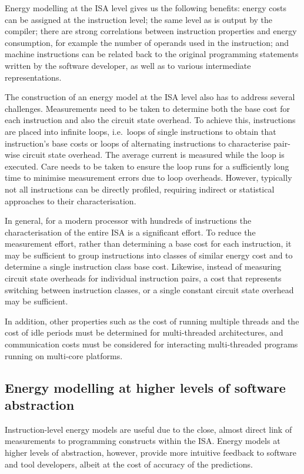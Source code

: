 \documentclass[oneside]{book}
\begin{document}
Energy modelling at the ISA level gives us the following benefits: energy
costs can be assigned at the instruction level; the same level as is output by
the compiler; there are strong correlations between instruction properties and
energy consumption, for example the number of operands used in the instruction;
and machine instructions can be related back to the original programming
statements written by the software developer, as well as to various
intermediate representations. 

The construction of an energy model at the ISA level also has to address several
challenges.
%
Measurements need to be taken to determine both the base cost for each
instruction and also the circuit state overhead. To achieve this, instructions
are placed into infinite loops, i.e.\ loops of single instructions to obtain
that instruction's base costs or loops of alternating instructions to
characterise pair-wise circuit state overhead. The average current is measured
while the loop is executed. Care needs to be taken to ensure the loop runs for
a sufficiently long time to minimise measurement errors due to loop overheads.
%
However, typically not all instructions can be directly profiled, requiring
indirect or statistical approaches to their characterisation.

In general, for a modern processor with hundreds of instructions the
characterisation of the entire ISA is a significant effort.
%
To reduce the measurement effort, rather than determining a base cost for each
instruction, it may be sufficient to group instructions into classes of similar
energy cost and to determine a single instruction class base cost. Likewise,
instead of measuring circuit state overheads for individual instruction pairs,
a cost that represents switching between instruction classes, or a single
constant circuit state overhead may be sufficient.

In addition, other properties such as the cost of running multiple threads and
the cost of idle periods must be determined for multi-threaded architectures,
and communication costs must be considered for interacting multi-threaded
programs running on multi-core platforms. 
%
%
%
%
%
 

\subsection{Energy modelling at higher levels of software abstraction}
\label{subsec:mapping}

Instruction-level energy models are 
%
useful 
due to the close, almost direct
link of measurements to programming constructs within the ISA. Energy models at
higher levels of abstraction, however, provide more intuitive feedback to
software and tool developers, 
%
albeit 
at the cost of accuracy of the
predictions. 
\end{document}
